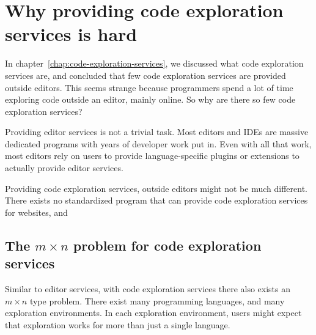 
\chapter{Why providing code exploration services is hard}
\label{chap:why-providing-code-exploration-services-is-hard}


In chapter~\ref{chap:code-exploration-services}, we discussed what code exploration services are, and
concluded that few code exploration services are provided outside editors.
This seems strange because programmers spend a lot of time exploring code outside an editor, mainly online.
So why are there so few code exploration services?

Providing editor services is not a trivial task.
Most editors and \acp{IDE} are massive dedicated programs with years of developer work put in.
Even with all that work, most editors rely on users to provide language-specific plugins or
extensions to actually provide editor services.

Providing code exploration services, outside editors might not be much different.
There exists no standardized program that can provide code exploration services for websites, and




\section{The $m \times n$ problem for code exploration services}\label{sec:the-$m-times-n$-problem-for-code-exploration-services}

Similar to editor services, with code exploration services there also exists an $m \times n$ type problem.
There exist many programming languages, and many exploration environments.
In each exploration environment, users might expect that exploration works for more than just a single language.

